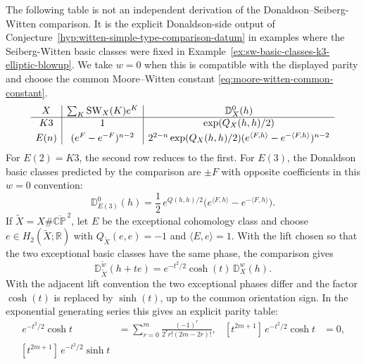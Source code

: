 \begin{example}
\label{ex:donaldson-side-k3-elliptic-blowup-tables}
The following table is not an independent derivation of the
Donaldson--Seiberg-Witten comparison.  It is the explicit Donaldson-side output
of Conjecture~\ref{hyp:witten-simple-type-comparison-datum} in examples where
the Seiberg-Witten basic classes were fixed in
Example~\ref{ex:sw-basic-classes-k3-elliptic-blowup}.  We take \(w=0\) when
this is compatible with the displayed parity and choose the common
Moore--Witten constant \eqref{eq:moore-witten-common-constant}.
\[
\begin{array}{c|c|c}
  X & \sum_K{\rm SW}_X(K)e^K & \mathbb D_X^0(h)\\
  \hline
  K3
  & 1
  & \exp(Q_X(h,h)/2)\\[1mm]
  E(n)
  & (e^F-e^{-F})^{n-2}
  & 2^{2-n}\exp(Q_X(h,h)/2)(e^{\langle F,h\rangle}
       -e^{-\langle F,h\rangle})^{n-2}
\end{array}
\]
For \(E(2)=K3\), the second row reduces to the first.  For \(E(3)\), the
Donaldson basic classes predicted by the comparison are \(\pm F\) with
opposite coefficients in this \(w=0\) convention:
\begin{equation}
  \mathbb D_{E(3)}^0(h)
  =
  \frac12\,e^{Q(h,h)/2}
  \bigl(e^{\langle F,h\rangle}-e^{-\langle F,h\rangle}\bigr).
  \label{eq:donaldson-e3-table}
\end{equation}
If \(\widetilde X=X\#\overline{\mathbb{CP}}^{\,2}\), let \(E\) be the
exceptional cohomology class and choose \(e\in H_2(\widetilde X;\mathbb R)\)
with \(Q_{\widetilde X}(e,e)=-1\) and \(\langle E,e\rangle=1\).  With the
lift chosen so that the two exceptional basic classes have the same phase,
the comparison gives
\begin{equation}
  \mathbb D_{\widetilde X}^{\widetilde w}(h+te)
  =
  e^{-t^2/2}\cosh(t)\,\mathbb D_X^w(h).
  \label{eq:donaldson-blowup-cosh-form}
\end{equation}
With the adjacent lift convention the two exceptional phases differ and the
factor \(\cosh(t)\) is replaced by \(\sinh(t)\), up to the common orientation
sign.  In the exponential generating series this gives an explicit parity
table:
\begin{align}
  [t^{2m}]\,e^{-t^2/2}\cosh t
  &=
  \sum_{r=0}^{m}
  \frac{(-1)^r}{2^r r!(2m-2r)!},
  &
  [t^{2m+1}]\,e^{-t^2/2}\cosh t
  &=0,
  \label{eq:donaldson-blowup-even-lift-coefficients}\\
  [t^{2m+1}]\,e^{-t^2/2}\sinh t

\end{align}
\end{example}
